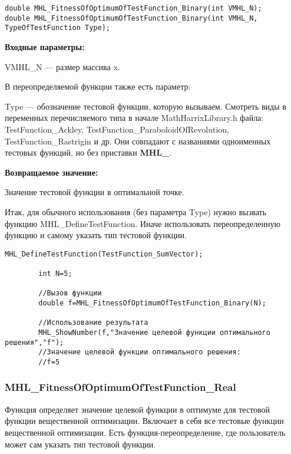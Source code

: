 \documentclass[a4paper,12pt]{article}
\begin{document}
\begin{lstlisting}[label=code_syntax_MHL_FitnessOfOptimumOfTestFunction_Binary,caption=Синтаксис]
double MHL_FitnessOfOptimumOfTestFunction_Binary(int VMHL_N);
double MHL_FitnessOfOptimumOfTestFunction_Binary(int VMHL_N, TypeOfTestFunction Type);
\end{lstlisting}

\textbf{Входные параметры:}

VMHL\_N --- размер массива x.

В переопределяемой функции также есть параметр:
  
Type --- обозначение тестовой функции, которую вызываем.
Смотреть виды в переменных перечисляемого типа в начале MathHarrixLibrary.h файла: TestFunction\_Ackley, TestFunction\_ParaboloidOfRevolution, TestFunction\_Rastrigin и др. Они совпадают с названиями одноименных тестовых функций, но без приставки \textbf{MHL\_}.

\textbf{Возвращаемое значение:}
 
Значение тестовой функции в оптимальной точке.

Итак, для обычного использования (без параметра Type) нужно вызвать функцию MHL\_DefineTestFunction. Иначе использовать переопределенную функцию и самому указать тип тестовой функции.


\begin{lstlisting}[label=code_use_MHL_FitnessOfOptimumOfTestFunction_Binary,caption=Пример использования]
        MHL_DefineTestFunction(TestFunction_SumVector);

        int N=5;

        //Вызов функции
        double f=MHL_FitnessOfOptimumOfTestFunction_Binary(N);

        //Использование результата
        MHL_ShowNumber(f,"Значение целевой функции оптимального решения","f");
        //Значение целевой функции оптимального решения:
        //f=5
\end{lstlisting}

\subsubsection{MHL\_FitnessOfOptimumOfTestFunction\_Real}\label{MHL_FitnessOfOptimumOfTestFunction_Real}

Функция определяет значение целевой функции в оптимуме для тестовой функции вещественной оптимизации. Включает в себя все тестовые функции вещественной оптимизации. Есть функция-переопределение, где пользователь может сам указать тип тестовой функции.
\end{document}
